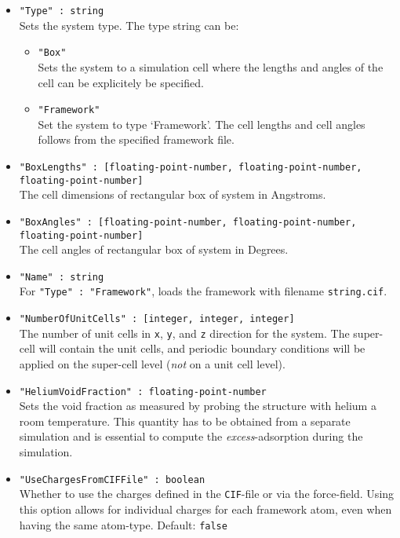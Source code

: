 \begin{itemize}
\item{\verb+"Type" : string+}\\
Sets the system type. The type string can be:
  \begin{itemize}
  \item{\verb+"Box"+}\\
    Sets the system to a simulation cell where the lengths and angles of the cell can be explicitely be specified.
  \item{\verb+"Framework"+}\\
    Set the system to type `Framework'. The cell lengths and cell angles follows from the specified framework file.
  \end{itemize}
\item{\verb+"BoxLengths" : [floating-point-number, floating-point-number, floating-point-number]+}\\
The cell dimensions of rectangular box of system in Angstroms.
\item{\verb+"BoxAngles" : [floating-point-number, floating-point-number, floating-point-number]+}\\
The cell angles of rectangular box of system in Degrees.
\item{\verb+"Name" : string+}\\
For \verb+"Type" : "Framework"+, loads the framework with filename \verb+string.cif+.
\item{\verb+"NumberOfUnitCells" : [integer, integer, integer]+}\\
The number of unit cells in \verb+x+, \verb+y+, and \verb+z+ direction for the system. 
The super-cell will contain the unit cells, and periodic boundary conditions
will be applied on the super-cell level (\emph{not} on a unit cell level).
\item{\verb+"HeliumVoidFraction" : floating-point-number+}\\
Sets the void fraction as measured by probing the structure with helium a room temperature. 
This quantity has to be obtained from a separate simulation 
and is essential to compute the \emph{excess}-adsorption during the simulation.
\item{\verb+"UseChargesFromCIFFile" : boolean+}\\
  Whether to use the charges defined in the \texttt{CIF}-file or via the force-field. 
Using this option allows for individual charges for each framework atom, even when having the same atom-type.
Default: \verb+false+
\end{itemize}

